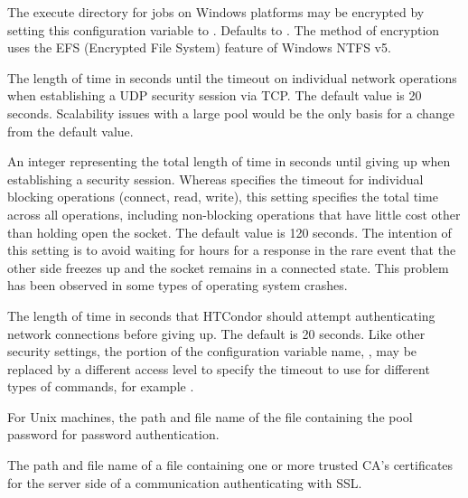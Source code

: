 \begin{description}
\label{param:EncryptExecuteDirectory}
\item[\Macro{ENCRYPT\_EXECUTE\_DIRECTORY}]
  The execute directory for jobs on Windows platforms may be
  encrypted by setting this configuration variable to .
  Defaults to .
  The method of encryption uses the EFS (Encrypted File System)
  feature of Windows NTFS v5.

\label{param:SecTCPSessionTimeout}
\item[\Macro{SEC\_TCP\_SESSION\_TIMEOUT}]
  The length of time in seconds until the timeout
  on individual network operations when establishing a UDP security
  session via TCP.
  The default value is 20 seconds.
  Scalability issues with a large pool would be the only basis
  for a change from the default value.

\label{param:SecTCPSessionDeadline}
\item[\Macro{SEC\_TCP\_SESSION\_DEADLINE}]
  An integer representing the total length of time in seconds until giving up
  when establishing a security session.  Whereas
   specifies the timeout
  for individual blocking operations (connect, read, write), this
  setting specifies the total time across all operations, including
  non-blocking operations that have little cost other than holding
  open the socket.
  The default value is 120 seconds.
  The intention of this setting is to avoid waiting for hours
  for a response in the rare event that the other side
  freezes up and the socket remains in a connected state.
  This problem has been observed in some types of operating system
  crashes.

\label{param:SecDefaultAuthenticationTimeout}
\item[\Macro{SEC\_DEFAULT\_AUTHENTICATION\_TIMEOUT}]
  The length of time in seconds that HTCondor should attempt
  authenticating network connections before giving up.
  The default is 20 seconds.
  Like other security settings, the portion of the configuration variable
  name, , 
  may be replaced by a different access level to specify the timeout to use for
  different types of commands, for example
  .

\label{param:SecPasswordFile}
\item[\Macro{SEC\_PASSWORD\_FILE}]
  For Unix machines, the path and file name
  of  the file containing the pool password for password authentication.


\label{param:AuthSSLServerCAFile}
\item[\Macro{AUTH\_SSL\_SERVER\_CAFILE}]
  The path and file name of
  a file containing one or more trusted CA's certificates
  for the server side of a communication authenticating 
  with SSL.


\end{description}
